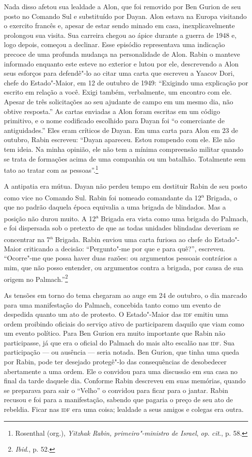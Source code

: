Nada disso afetou sua lealdade a Alon, que foi removido por Ben Gurion
de seu posto no Comando Sul e substituído por Dayan. Alon estava na
Europa visitando o exercito francês e, apesar de estar sendo minado em
casa, inexplicavelmente prolongou sua visita. Sua carreira chegou
ao ápice durante a guerra de 1948 e, logo depois, começou a declinar.
Esse episódio representava uma indicação precoce de uma profunda mudança
na personalidade de Alon. Rabin o manteve informado enquanto este
esteve no exterior e lutou por ele, descrevendo a Alon seus esforços
para defendê"-lo ao citar uma carta que escreveu a Yaacov Dori, chefe do
Estado"-Maior, em 12 de outubro de 1949: ``Exigindo uma explicação por
escrito em relação a você. Exigi também, verbalmente, um encontro com
ele. Apesar de três solicitações ao seu ajudante de campo em um mesmo
dia, não obtive resposta.'' As cartas enviadas a Alon foram escritas em
um código primitivo, e o nome codificado escolhido para Dayan foi ``o
comerciante de antiguidades.'' Eles eram críticos de Dayan. Em uma carta
para Alon em 23 de outubro, Rabin escreveu: ``Dayan apareceu. Estou
rompendo com ele. Ele não tem ideia. Na minha opinião, ele não tem a
mínima compreensão militar quando se trata de formações acima de uma
companhia ou um batalhão. Totalmente sem tato ao tratar com as
pessoas''.\footnote{Rosenthal (org.), \emph{Yitzhak Rabin, primeiro"-ministro de Israel}, \emph{op}. \emph{cit}., p. 58.}

A antipatia era mútua. Dayan não perdeu tempo em destituir Rabin de seu
posto como vice no Comando Sul. Rabin foi nomeado comandante da
12\textsuperscript{a} Brigada, o que no padrão daquela época equivalia a
uma brigada de blindados. Mas a posição não durou muito. A
12\textsuperscript{a} Brigada era vista como uma brigada do Palmach, e
foi dispersada sob o pretexto de que as todas unidades blindadas
deveriam se concentrar na 7\textsuperscript{a} Brigada. Rabin enviou
uma carta furiosa ao chefe do Estado"-Maior criticando a decisão: ``Pergunto"-me por que e para quê?'', escreveu. ``Ocorre"-me que possa
haver duas razões: ou argumentos pessoais contrários a mim, que não
posso entender, ou argumentos contra a brigada, por causa de sua origem
no Palmach.''\footnote{\emph{Ibid}., p. 52.}

As tensões em torno do tema chegaram ao auge em 24 de
outubro, o dia marcado para uma manifestação do Palmach, concebida tanto
como um evento de despedida quanto um ato de protesto. O Estado"-Maior
das \textsc{idf} emitiu uma ordem proibindo oficiais do serviço ativo de
participarem daquilo que viam como um evento político. Para Ben Gurion
era muito importante que Rabin não participasse, já que era o oficial do
Palmach do mais alto escalão nas \textsc{idf}. Sua participação --- ou ausência ---
seria notada. Ben Gurion, que tinha uma queda por Rabin, pode ter
desejado protegê"-lo das consequências de desobedecer abertamente a uma
ordem. Ele o convidou para uma discussão em sua casa no final da tarde
daquele dia. Conforme Rabin descreveu em suas memórias, quando se
preparava para sair o ``Velho'' o convidou para ficar para o jantar.
Rabin recusou e foi para a manifestação, sabendo que pagaria o preço de
seu ato de rebeldia. Ficar nas \textsc{idf} era uma coisa; lealdade a seus amigos
e colegas era outra.

